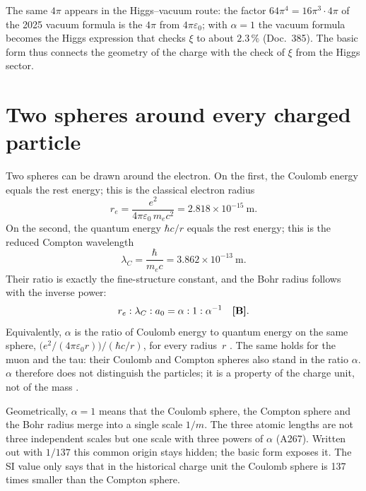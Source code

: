 The same $4\pi$ appears in the Higgs--vacuum route: the factor $64\pi^4=16\pi^3\cdot4\pi$ of the
2025 vacuum formula is the $4\pi$ from $4\pi\varepsilon_0$; with $\alpha=1$ the vacuum formula
becomes the Higgs expression that checks $\xi$ to about $2.3\,\%$ (Doc.~385). The basic form thus
connects the geometry of the charge with the check of $\xi$ from the Higgs sector.

\section{Two spheres around every charged particle}

Two spheres can be drawn around the electron. On the first, the Coulomb energy equals the rest
energy; this is the classical electron radius
\begin{equation}
  r_e=\frac{e^2}{4\pi\varepsilon_0\,m_ec^2}=2.818\times10^{-15}\ \text{m}.
\end{equation}
On the second, the quantum energy $\hbar c/r$ equals the rest energy; this is the reduced Compton
wavelength
\begin{equation}
  \lambda_C=\frac{\hbar}{m_ec}=3.862\times10^{-13}\ \text{m}.
\end{equation}
Their ratio is exactly the fine-structure constant, and the Bohr radius follows with the inverse
power:
\begin{equation}
  r_e:\lambda_C:a_0=\alpha:1:\alpha^{-1}\quad\textbf{[B]} .
\end{equation}
Equivalently, $\alpha$ is the ratio of Coulomb energy to quantum energy on the same sphere,
$\bigl(e^2/(4\pi\varepsilon_0r)\bigr)/(\hbar c/r)$, for every radius~$r$ \KM. The same holds for
the muon and the tau: their Coulomb and Compton spheres also stand in the ratio $\alpha$. $\alpha$
therefore does not distinguish the particles; it is a property of the charge unit, not of the mass
\BM.

Geometrically, $\alpha=1$ means that the Coulomb sphere, the Compton sphere and the Bohr radius
merge into a single scale $1/m$. The three atomic lengths are not three independent scales but one
scale with three powers of $\alpha$ (A267). Written out with $1/137$ this common origin stays
hidden; the basic form exposes it. The SI value only says that in the historical charge unit the
Coulomb sphere is 137 times smaller than the Compton sphere.

